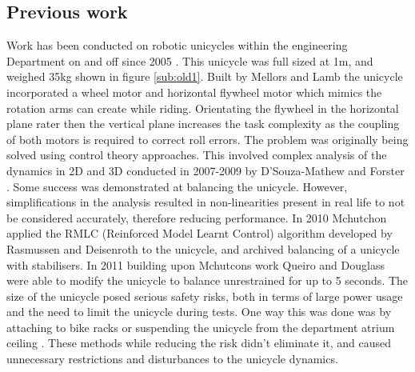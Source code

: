 \documentclass[twoside,twocolumn,12pt]{article}
\begin{document}
\subsection{Previous work}
Work has been conducted on robotic unicycles within the engineering Department on and off since 2005 \cite{original}. This unicycle was full sized at 1m, and weighed 35kg shown in figure \ref{sub:old1}. Built by Mellors and Lamb the unicycle incorporated a wheel motor and horizontal flywheel motor which mimics the rotation arms can create while riding. Orientating the flywheel in the horizontal plane  rater then the vertical plane increases the task complexity as the coupling of both motors is required to correct roll errors.
\newline
The problem was originally being solved using control theory approaches. This involved complex analysis of the dynamics in 2D and 3D conducted in 2007-2009 by D'Souza-Mathew \cite{neil} and Forster  \cite{forster}. Some success was demonstrated at balancing the unicycle. However, simplifications in the analysis resulted in non-linearities present in real life to not be considered accurately, therefore reducing performance.
\newline
In 2010 Mchutchon \cite{mchut} applied the RMLC (Reinforced Model Learnt Control) algorithm developed by Rasmussen and Deisenroth to the unicycle, and archived balancing of a unicycle with stabilisers. In 2011 building upon Mchutcons work Queiro \cite{roderigo} and Douglass \cite{douglass} were able to modify the unicycle to balance unrestrained for up to 5 seconds. 
\newline
The size of the unicycle posed serious safety risks, both in terms of large power usage and the need to limit the unicycle during tests. One way this was done was by attaching to bike racks \cite{neil} or suspending the unicycle from the department atrium ceiling \cite{roderigo}. These methods while reducing the risk didn't eliminate it, and caused unnecessary restrictions and disturbances to the unicycle dynamics. 
\end{document}
